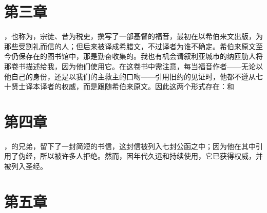 
\section{第三章}

，也称为，宗徒、昔为税吏，撰写了一部基督的福音，最初在以希伯来文出版，为那些受割礼而信的人；但后来被译成希腊文，不过译者为谁不确定。希伯来原文至今仍保存在的图书馆中，那是勤奋收集的。我也有机会请叙利亚城市的纳匝肋人将那卷书描述给我，因为他们使用它。在这卷书中需注意，每当福音作者——无论以他自己的身份，还是以我们的主救主的口吻——引用旧约的见证时，他都不遵从七十贤士译本译者的权威，而是跟随希伯来原文。因此这两个形式存在：和\par


\section{第四章}

，的兄弟，留下了一封简短的书信，这封信被列入七封公函之中；因为他在其中引用了伪经，所以被许多人拒绝。然而，因年代久远和持续使用，它已获得权威，并被列入圣经。\par


\section{第五章}

